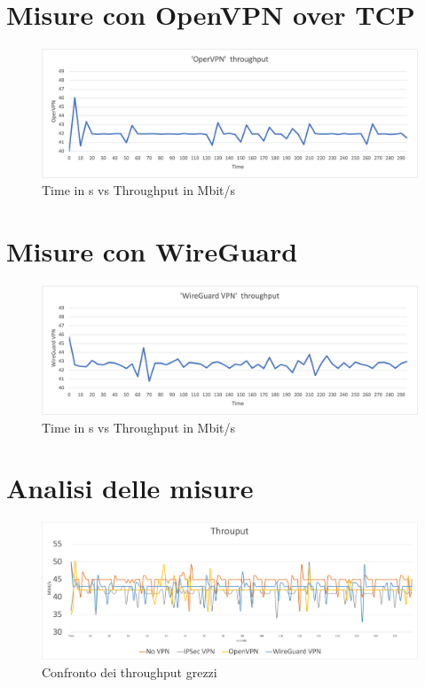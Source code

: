 \section{Misure con OpenVPN over TCP}
\begin{figure}[ht]
    \centering
    \includegraphics[width=12cm]{figure/vpn_thr.png-3.png}
    \caption{Time in s vs Throughput in Mbit/s}
\end{figure}

\section{Misure con WireGuard}
\begin{figure}[ht]
    \centering
    \includegraphics[width=12cm]{figure/vpn_thr.png-4.png}
    \caption{Time in s vs Throughput in Mbit/s}
\end{figure}

\section{Analisi delle misure}
\begin{figure}[ht]
    \centering
    \includegraphics[width=14cm]{figure/rawThroughput.png}
    \caption{Confronto dei throughput grezzi}
\end{figure}

